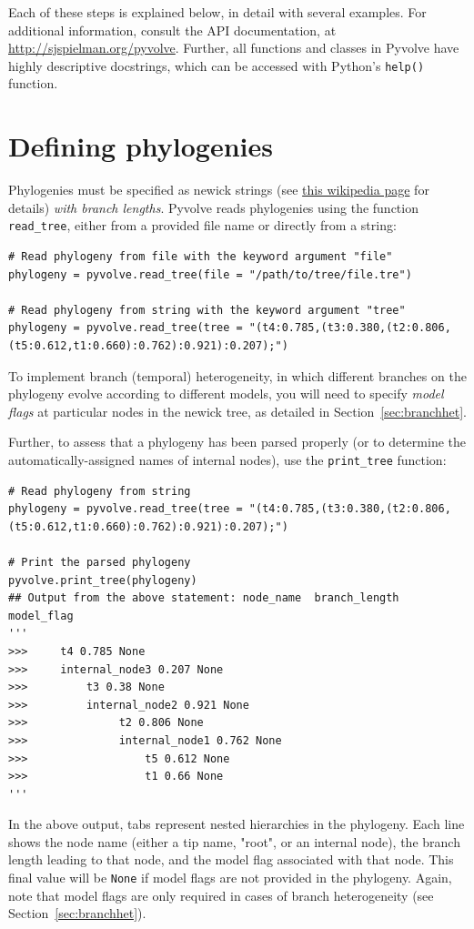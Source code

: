 \documentclass{article}
\newcommand{\code}[1]{\texttt{\small{#1}}}
\begin{document}
Each of these steps is explained below, in detail with several examples. For additional information, consult the API documentation, at \href{http://sjspielman.org/pyvolve}{http://sjspielman.org/pyvolve}. Further, all functions and classes in Pyvolve have highly descriptive docstrings, which can be accessed with Python's \code{help()} function.


\section{Defining phylogenies}\label{sec:phylogeny}

Phylogenies must be specified as newick strings (see \href{https://en.wikipedia.org/wiki/Newick_format}{this wikipedia page} for details) \emph{with branch lengths}. Pyvolve reads phylogenies using the function \code{read\_tree}, either from a provided file name or directly from a string:
\begin{lstlisting}
# Read phylogeny from file with the keyword argument "file"
phylogeny = pyvolve.read_tree(file = "/path/to/tree/file.tre")

# Read phylogeny from string with the keyword argument "tree"
phylogeny = pyvolve.read_tree(tree = "(t4:0.785,(t3:0.380,(t2:0.806,(t5:0.612,t1:0.660):0.762):0.921):0.207);")
\end{lstlisting}

To implement branch (temporal) heterogeneity, in which different branches on the phylogeny evolve according to different models, you will need to specify \emph{model flags} at particular nodes in the newick tree, as detailed in Section~\ref{sec:branchhet}.

Further, to assess that a phylogeny has been parsed properly (or to determine the automatically-assigned names of internal nodes), use the \code{print\_tree} function:
\begin{lstlisting}
# Read phylogeny from string
phylogeny = pyvolve.read_tree(tree = "(t4:0.785,(t3:0.380,(t2:0.806,(t5:0.612,t1:0.660):0.762):0.921):0.207);")

# Print the parsed phylogeny
pyvolve.print_tree(phylogeny)
## Output from the above statement: node_name  branch_length  model_flag
'''
>>>     t4 0.785 None
>>>     internal_node3 0.207 None
>>>         t3 0.38 None
>>>         internal_node2 0.921 None
>>>              t2 0.806 None
>>>              internal_node1 0.762 None
>>>                  t5 0.612 None
>>>                  t1 0.66 None
'''
\end{lstlisting}
In the above output, tabs represent nested hierarchies in the phylogeny. Each line shows the node name (either a tip name, "root", or an internal node), the branch length leading to that node, and the model flag associated with that node. This final value will be \code{None} if model flags are not provided in the phylogeny. Again, note that model flags are only required in cases of branch heterogeneity (see Section~\ref{sec:branchhet}).
\end{document}
